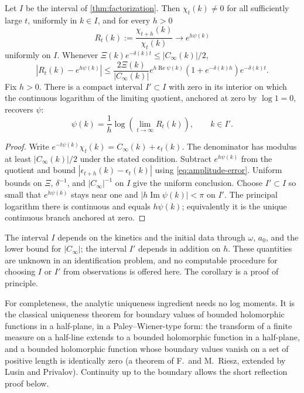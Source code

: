 \begin{corollary}\label{cor:fourier-ratio}
Let $I$ be the interval of \cref{thm:factorization}. Then
$\chi_t(k)\ne0$ for all sufficiently large $t$, uniformly in $k\in I$,
and for every $h>0$
\begin{equation}
 R_t(k):=\frac{\chi_{t+h}(k)}{\chi_t(k)}
       \longrightarrow e^{h\psi(k)}
 \label{eq:ratio-limit}
\end{equation}
uniformly on $I$. Whenever
$\Xi(k)e^{-\delta(k)t}\leq|C_\infty(k)|/2$,
\begin{equation}
 |R_t(k)-e^{h\psi(k)}|
 \leq \frac{2\Xi(k)}{|C_\infty(k)|}
 e^{h\operatorname{Re}\psi(k)}(1+e^{-\delta(k)h})e^{-\delta(k)t}.
 \label{eq:ratio-bias}
\end{equation}
Fix $h>0$. There is a compact interval $I'\subset I$ with zero in its
interior on which the continuous logarithm of the limiting quotient,
anchored at zero by $\log 1=0$, recovers $\psi$:
\begin{equation}
 \psi(k)=\frac1h\log\!\left(\lim_{t\to\infty}R_t(k)\right),
 \qquad k\in I'.
 \label{eq:local-exponent}
\end{equation}
\end{corollary}

\begin{proof}
Write $e^{-t\psi(k)}\chi_t(k)=C_\infty(k)+\epsilon_t(k)$.
The denominator has modulus at least $|C_\infty(k)|/2$ under the
stated condition. Subtract $e^{h\psi(k)}$ from the quotient and bound
$|\epsilon_{t+h}(k)-\epsilon_t(k)|$ using
\eqref{eq:amplitude-error}. Uniform bounds on $\Xi$, $\delta^{-1}$,
and $|C_\infty|^{-1}$ on $I$ give the uniform conclusion.
Choose $I'\subset I$ so small that $e^{h\psi(k)}$ stays near one and
$|h\operatorname{Im}\psi(k)|<\pi$ on $I'$. The principal logarithm there
is continuous and equals $h\psi(k)$; equivalently it is the unique
continuous branch anchored at zero.
\end{proof}

The interval $I$ depends on the kinetics and the initial data through
$\omega$, $a_0$, and the lower bound for $|C_\infty|$; the interval $I'$
depends in addition on $h$. These quantities are unknown in an
identification problem, and no computable procedure for choosing $I$ or
$I'$ from observations is offered here. The corollary is a proof of
principle.

For completeness, the analytic uniqueness ingredient needs no log moments.
It is the classical uniqueness theorem for boundary values of bounded
holomorphic functions in a half-plane, in a Paley--Wiener-type form: the
transform of a finite measure on a half-line extends to a bounded
holomorphic function in a half-plane, and a bounded holomorphic function
whose boundary values vanish on a set of positive length is identically
zero (a theorem of F.\ and M.\ Riesz, extended by Lusin and Privalov).
Continuity up to the boundary allows the short reflection proof below.

